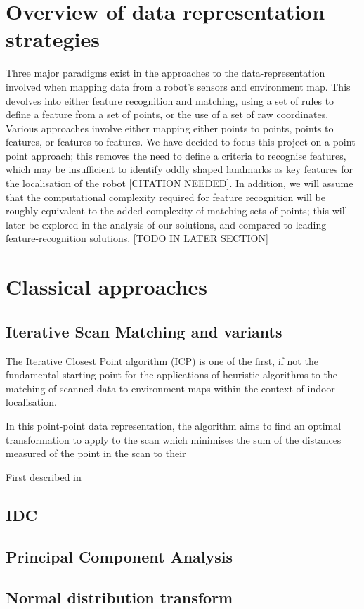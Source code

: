 \documentclass[authoryearcitations]{UoYCSproject}
\begin{document}
\section{Overview of data representation strategies}
Three major paradigms exist in the approaches to the data-representation involved when mapping data from a robot's sensors and environment map. This devolves into either feature recognition and matching, using a set of rules to define a feature from a set of points, or the use of a set of raw coordinates. Various approaches involve either mapping either points to points, points to features, or features to features. We have decided to focus this project on a point-point approach; this removes the need to define a criteria to recognise features, which may be insufficient to identify oddly shaped landmarks as key features for the localisation of the robot [CITATION NEEDED]. In addition, we will assume that the computational complexity required for feature recognition will be roughly equivalent to the added complexity of matching sets of points; this will later be explored in the analysis of our solutions, and compared to leading feature-recognition solutions. [TODO IN LATER SECTION]

\section{Classical approaches}
\subsection{Iterative Scan Matching and variants}
The Iterative Closest Point algorithm (ICP) is one of the first, if not the fundamental starting point for the applications of heuristic algorithms to the matching of scanned data to environment maps within the context of indoor localisation.

In this point-point data representation, the algorithm aims to find an optimal transformation to apply to the scan which minimises the sum of the distances measured  of the point in the scan to their

First described in 
\subsection{IDC}
\subsection{Principal Component Analysis}
\subsection{Normal distribution transform}
\end{document}
